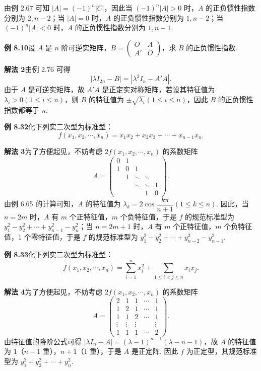 \documentclass[UTF8, 12pt, fontset=fandol, oneside]{ctexart}
\begin{document}
由例 2.67 可知 $|A|=(-1)^n|C|$，因此当 $(-1)^n|A|>0$ 时，$A$ 的正负惯性指数分别为 $2,n-2$；当 $|A|=0$ 时，$A$ 的正负惯性指数分别为 $1,n-2$；当 $(-1)^n|A|<0$ 时，$A$ 的正负惯性指数分别为 $1,n-1$.

\noindent\textbf{例 8.10}\quad 设 $A$ 是 $n$ 阶可逆实矩阵，$B=\begin{pmatrix}O&A\\ A'&O\end{pmatrix}$，求 $B$ 的正负惯性指数.

\noindent\textbf{解法 2}\quad 由例 2.76 可得
\[
|\lambda I_{2n}-B|=|\lambda^2I_n-A'A|.
\]
由于 $A$ 是可逆实矩阵，故 $A'A$ 是正定实对称矩阵，若设其特征值为 $\lambda_i>0(1\le i\le n)$，则 $B$ 的特征值为 $\pm\sqrt{\lambda_i}(1\le i\le n)$，因此 $B$ 的正负惯性指数都等于 $n$.

\noindent\textbf{例 8.32}\quad 化下列实二次型为标准型：
\[
f(x_1,x_2,\cdots,x_n)=x_1x_2+x_2x_3+\cdots+x_{n-1}x_n.
\]

\noindent\textbf{解法 3}\quad 为了方便起见，不妨考虑 $2f(x_1,x_2,\cdots,x_n)$ 的系数矩阵
\[
A=\begin{pmatrix}
0&1&&&\\
1&0&1&&\\
&1&\ddots&\ddots&\\
&&\ddots&\ddots&1\\
&&&1&0
\end{pmatrix}.
\]
由例 6.65 的计算可知，$A$ 的特征值为 $\lambda_k=2\cos\dfrac{k\pi}{n+1}(1\le k\le n)$. 因此，当 $n=2m$ 时，$A$ 有 $m$ 个正特征值，$m$ 个负特征值，于是 $f$ 的规范标准型为 $y_1^2-y_2^2+\cdots+y_{n-1}^2-y_n^2$；当 $n=2m+1$ 时，$A$ 有 $m$ 个正特征值，$m$ 个负特征值，1 个零特征值，于是 $f$ 的规范标准型为 $y_1^2-y_2^2+\cdots+y_{n-2}^2-y_{n-1}^2$.

\noindent\textbf{例 8.33}\quad 化下列实二次型为标准型：
\[
f(x_1,x_2,\cdots,x_n)=\sum_{i=1}^nx_i^2+\sum_{1\le i<j\le n}x_ix_j.
\]

\noindent\textbf{解法 4}\quad 为了方便起见，不妨考虑 $2f(x_1,x_2,\cdots,x_n)$ 的系数矩阵
\[
A=\begin{pmatrix}
2&1&1&\cdots&1\\
1&2&1&\cdots&1\\
1&1&2&\cdots&1\\
\vdots&\vdots&\vdots&&\vdots\\
1&1&1&\cdots&2
\end{pmatrix}.
\]
由特征值的降阶公式可得 $|\lambda I_n-A|=(\lambda-1)^{n-1}(\lambda-n-1)$，故 $A$ 的特征值为 1（$n-1$ 重），$n+1$（1 重），于是 $A$ 是正定阵. 因此 $f$ 为正定型，其规范标准型为 $y_1^2+y_2^2+\cdots+y_n^2$.
\end{document}

